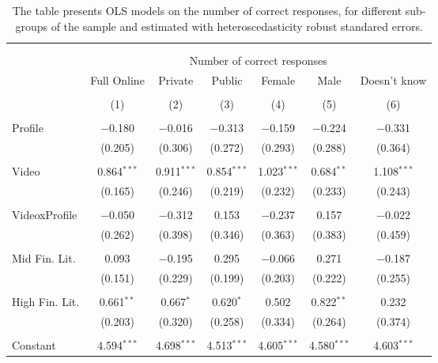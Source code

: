 
\begin{table}[H] \centering 
  \caption{The table presents OLS models on the number of correct responses, for different sub-groups of the sample and estimated with 
            heteroscedasticity robust standared errors.} 
  \label{tbl:Main_results_correct_response} 
\begin{tabular}{@{\extracolsep{5pt}}lcccccc} 
\\[-1.8ex]\hline 
\hline \\[-1.8ex] 
\\[-1.8ex] & \multicolumn{6}{c}{Number of correct responses} \\ 
 & Full Online & Private & Public & Female & Male & Doesn't know \\ 
\\[-1.8ex] & (1) & (2) & (3) & (4) & (5) & (6)\\ 
\hline \\[-1.8ex] 
 Profile & $-$0.180 & $-$0.016 & $-$0.313 & $-$0.159 & $-$0.224 & $-$0.331 \\ 
  & (0.205) & (0.306) & (0.272) & (0.293) & (0.288) & (0.364) \\ 
  & & & & & & \\ 
 Video & 0.864$^{***}$ & 0.911$^{***}$ & 0.854$^{***}$ & 1.023$^{***}$ & 0.684$^{**}$ & 1.108$^{***}$ \\ 
  & (0.165) & (0.246) & (0.219) & (0.232) & (0.233) & (0.243) \\ 
  & & & & & & \\ 
 VideoxProfile & $-$0.050 & $-$0.312 & 0.153 & $-$0.237 & 0.157 & $-$0.022 \\ 
  & (0.262) & (0.398) & (0.346) & (0.363) & (0.383) & (0.459) \\ 
  & & & & & & \\ 
 Mid Fin. Lit. & 0.093 & $-$0.195 & 0.295 & $-$0.066 & 0.271 & $-$0.187 \\ 
  & (0.151) & (0.229) & (0.199) & (0.203) & (0.222) & (0.255) \\ 
  & & & & & & \\ 
 High Fin. Lit. & 0.661$^{**}$ & 0.667$^{*}$ & 0.620$^{*}$ & 0.502 & 0.822$^{**}$ & 0.232 \\ 
  & (0.203) & (0.320) & (0.258) & (0.334) & (0.264) & (0.374) \\ 
  & & & & & & \\ 
 Constant & 4.594$^{***}$ & 4.698$^{***}$ & 4.513$^{***}$ & 4.605$^{***}$ & 4.580$^{***}$ & 4.603$^{***}$ \\ 

\end{tabular}
\end{table}
